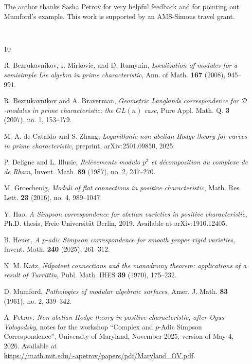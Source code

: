 \documentclass[11pt]{amsart}
\begin{document}
The author thanks Sasha Petrov for very helpful feedback and for pointing out Mumford's example.
This work is supported by an AMS-Simons travel grant.

\;\\




\begin{thebibliography}{10}

R. Bezrukavnikov, I. Mirkovic, and D. Rumynin,
\emph{Localization of modules for a semisimple Lie algebra in prime
characteristic},
Ann. of Math. \textbf{167} (2008), 945--991.

R. Bezrukavnikov and A. Braverman,
\emph{Geometric Langlands correspondence for \(\mathcal D\)-modules in prime
characteristic: the \(GL(n)\) case},
Pure Appl. Math. Q. \textbf{3} (2007), no. 1, 153--179.



M. A. de Cataldo and S. Zhang,
\emph{Logarithmic non-abelian Hodge theory for curves in prime characteristic},
preprint, arXiv:2501.09850, 2025.

P. Deligne and L. Illusie,
\emph{Rel\`evements modulo \(p^2\) et d\'ecomposition du complexe de de Rham},
Invent. Math. \textbf{89} (1987), no. 2, 247--270.

M. Groechenig,
\emph{Moduli of flat connections in positive characteristic},
Math. Res. Lett. \textbf{23} (2016), no. 4, 989--1047.

Y. Hao,
\emph{A Simpson correspondence for abelian varieties in positive
characteristic},
Ph.D. thesis, Freie Universit\"at Berlin, 2019.
Available at arXiv:1910.12405.

B. Heuer,
\emph{A \(p\)-adic Simpson correspondence for smooth proper rigid varieties},
Invent. Math. \textbf{240} (2025), 261--312.

N. M. Katz,
\emph{Nilpotent connections and the monodromy theorem: applications of a result
of Turrittin},
Publ. Math. IHES \textbf{39} (1970), 175--232.

D. Mumford,
\emph{Pathologies of modular algebraic surfaces},
Amer. J. Math. \textbf{83} (1961), no. 2, 339--342.



A. Petrov,
\emph{Non-abelian Hodge theory in positive characteristic, after
Ogus--Vologodsky},
notes for the workshop ``Complex and \(p\)-Adic Simpson Correspondence'',
University of Maryland, November 2025, version of May 4, 2026.
Available at \url{https://math.mit.edu/~apetrov/papers/pdf/Maryland_OV.pdf}.


\end{thebibliography}
\end{document}
